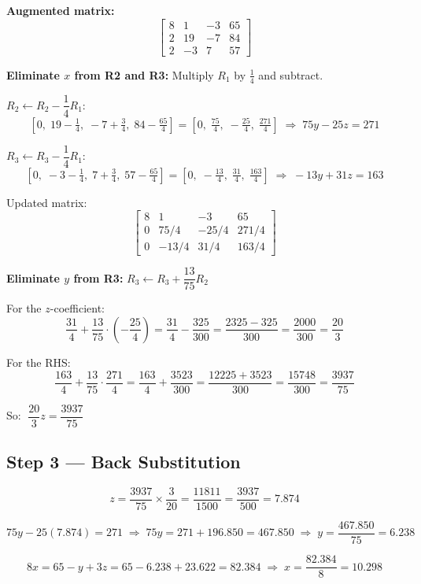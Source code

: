 \documentclass[12pt]{article}
\begin{document}
\textbf{Augmented matrix:}
\[
\left[\begin{array}{rrr|r}
  8 & 1 & -3 & 65 \\
  2 & 19 & -7 & 84 \\
  2 & -3 & 7 & 57
\end{array}\right]
\]

\medskip
\noindent\textbf{Eliminate $x$ from R2 and R3:} Multiply $R_1$ by $\tfrac{1}{4}$ and subtract.

$R_2 \leftarrow R_2 - \dfrac{1}{4}R_1$:
\[
  \left[0,\; 19 - \tfrac{1}{4},\; -7+\tfrac{3}{4},\; 84 - \tfrac{65}{4}\right]
  = \left[0,\; \tfrac{75}{4},\; -\tfrac{25}{4},\; \tfrac{271}{4}\right]
  \;\Rightarrow\; 75y - 25z = 271
\]

$R_3 \leftarrow R_3 - \dfrac{1}{4}R_1$:
\[
  \left[0,\; -3 - \tfrac{1}{4},\; 7+\tfrac{3}{4},\; 57 - \tfrac{65}{4}\right]
  = \left[0,\; -\tfrac{13}{4},\; \tfrac{31}{4},\; \tfrac{163}{4}\right]
  \;\Rightarrow\; -13y + 31z = 163
\]

Updated matrix:
\[
\left[\begin{array}{rrr|r}
  8 & 1 & -3 & 65 \\
  0 & 75/4 & -25/4 & 271/4 \\
  0 & -13/4 & 31/4 & 163/4
\end{array}\right]
\]

\medskip
\noindent\textbf{Eliminate $y$ from R3:} $R_3 \leftarrow R_3 + \dfrac{13}{75}R_2$

For the $z$-coefficient:
\[
  \frac{31}{4} + \frac{13}{75}\cdot\left(-\frac{25}{4}\right) = \frac{31}{4} - \frac{325}{300} = \frac{2325 - 325}{300} = \frac{2000}{300} = \frac{20}{3}
\]

For the RHS:
\[
  \frac{163}{4} + \frac{13}{75}\cdot\frac{271}{4} = \frac{163}{4} + \frac{3523}{300} = \frac{12225 + 3523}{300} = \frac{15748}{300} = \frac{3937}{75}
\]

So: $\;\dfrac{20}{3}z = \dfrac{3937}{75}$

\subsection*{Step 3 --- Back Substitution}

\[
  z = \frac{3937}{75} \times \frac{3}{20} = \frac{11811}{1500} = \frac{3937}{500} = \mathbf{7.874}
\]

\[
  75y - 25(7.874) = 271 \;\Rightarrow\; 75y = 271 + 196.850 = 467.850 \;\Rightarrow\; y = \frac{467.850}{75} = \mathbf{6.238}
\]

\[
  8x = 65 - y + 3z = 65 - 6.238 + 23.622 = 82.384 \;\Rightarrow\; x = \frac{82.384}{8} = \mathbf{10.298}
\]
\end{document}
